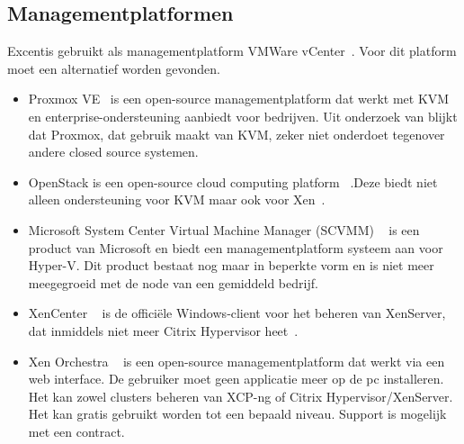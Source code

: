 \subsection{Managementplatformen}\label{subsec:managementplatformen}
Excentis gebruikt als managementplatform VMWare vCenter~\autocite{vmware}. Voor dit platform moet een alternatief worden gevonden.

\begin{itemize}
    \item Proxmox VE~\autocite{Proxmox} is een open-source managementplatform dat werkt met KVM en enterprise-ondersteuning aanbiedt voor bedrijven. Uit onderzoek van \textcite{ally2018comparative} blijkt dat Proxmox, dat gebruik maakt van KVM, zeker niet onderdoet tegenover andere closed source systemen.

    \item OpenStack is een open-source cloud computing platform ~\autocite{openstack2024}.Deze biedt niet alleen ondersteuning voor KVM maar ook voor Xen~\autocite{oleksiuk2023comparative}.

    \item Microsoft System Center Virtual Machine Manager (SCVMM) ~\autocite{microsoftvmm2025} is een product van Microsoft en biedt een managementplatform systeem aan voor Hyper-V. Dit product bestaat nog maar in beperkte vorm en is niet meer meegegroeid met de node van een gemiddeld bedrijf.

    \item XenCenter ~\autocite{xencenter2024} is de officiële Windows‑client voor het beheren van XenServer, dat inmiddels niet meer Citrix Hypervisor heet~\autocite{xenserverwebsite}.

    \item Xen Orchestra ~\autocite{el2021server} is een open-source managementplatform dat werkt via een web interface. De gebruiker moet geen applicatie meer op de pc installeren. Het kan zowel clusters beheren van XCP-ng of Citrix Hypervisor/XenServer. Het kan gratis gebruikt worden tot een bepaald niveau. Support is mogelijk met een contract.
\end{itemize}

